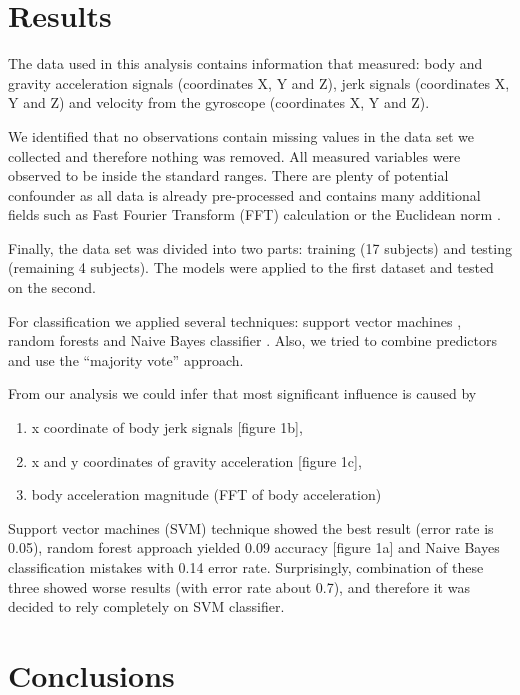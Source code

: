 \documentclass[a4paper,12pt]{extarticle}
\begin{document}
\section{Results}

The data used in this analysis contains information that measured:
body and gravity acceleration signals (coordinates X, Y and Z),
jerk signals (coordinates X, Y and Z) and
velocity from the gyroscope (coordinates X, Y and Z).

We identified that no observations contain missing values in the data set we collected and therefore nothing was removed.
All measured variables were observed to be inside the standard ranges. There are plenty of potential confounder as all data is already pre-processed and contains many additional fields such as Fast Fourier Transform (FFT) calculation or the Euclidean norm \cite{source:machineleariningrepo}.

Finally, the data set was divided into two parts: training (17 subjects) and testing (remaining 4 subjects). The models were applied to the first dataset and tested on the second.

For classification we applied several techniques: support vector machines \cite{sourse:dminr.svm}, random forests \cite{sourse:rblogger.classification} and Naive Bayes classifier \cite{sourse:dminr.naivebayes}. Also, we tried to combine predictors and use the ``majority vote'' approach.

From our analysis we could infer that most significant influence is caused by

\begin{enumerate}
  \item x coordinate of body jerk signals [figure 1b],
  \item x and y coordinates of gravity acceleration [figure 1c],
  \item body acceleration magnitude (FFT of body acceleration)
\end{enumerate}

Support vector machines (SVM) technique showed the best result (error rate is 0.05), random forest approach yielded 0.09 accuracy [figure 1a] and Naive Bayes classification mistakes with 0.14 error rate. Surprisingly, combination of these three showed worse results (with error rate about 0.7), and therefore it was decided to rely completely on SVM classifier.


\section{Conclusions}
\end{document}
